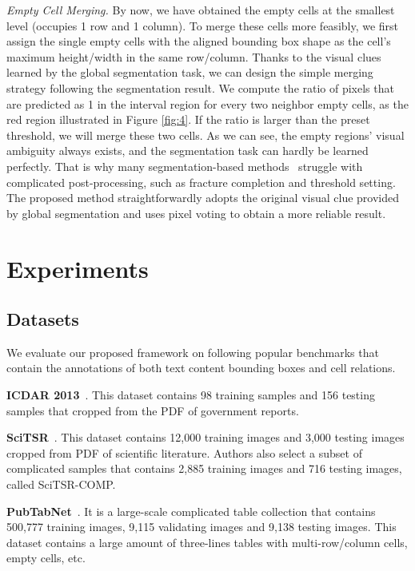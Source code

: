 \documentclass[runningheads]{llncs}
\begin{document}
\emph{Empty Cell Merging.}
By now, we have obtained the empty cells at the smallest level (occupies 1 row and 1 column).
To merge these cells more feasibly, we first assign the single empty cells with the aligned bounding box shape as the cell's maximum height/width in the same row/column.  Thanks to the visual clues learned by the global segmentation task, we can design the simple merging strategy following the segmentation result. We compute the ratio of pixels that are predicted as 1 in the interval region for every two neighbor empty cells, as the red region illustrated in Figure \ref{fig:4}. If the ratio is larger than the preset threshold, we will merge these two cells.
As we can see, the empty regions' visual ambiguity always exists, and the segmentation task can hardly be learned perfectly. That is why many segmentation-based methods~\cite{qasim2019rethinking,prasad2020cascadetabnet,paliwal2019tablenet} struggle with complicated post-processing, such as fracture completion and threshold setting. The proposed method straightforwardly adopts the original visual clue provided by global segmentation and uses pixel voting to obtain a more reliable result.


\section{Experiments}

\subsection{Datasets}
We evaluate our proposed framework on following popular benchmarks that contain the annotations of both text content bounding boxes and cell relations.

\textbf{ICDAR 2013}~\cite{gobel2013icdar}. This dataset contains 98 training samples and 156 testing samples that cropped from the PDF of government reports.

\textbf{SciTSR}~\cite{chi2019complicated}. This dataset contains 12,000 training images and 3,000 testing images cropped from PDF of scientific literature. Authors also select a subset of complicated samples that contains 2,885 training images and 716 testing images, called SciTSR-COMP.

\textbf{PubTabNet}~\cite{zhong2019image}. It is a large-scale complicated table collection that contains 500,777 training images, 9,115 validating images and 9,138 testing images. This dataset contains a large amount of three-lines tables with multi-row/column cells, empty cells, etc.
\end{document}
